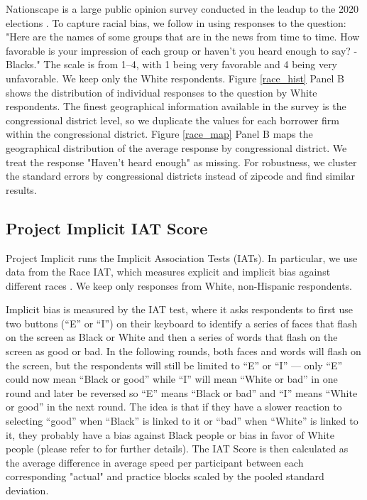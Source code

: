 \documentclass[11pt]{article}
\begin{document}
Nationscape is a large public opinion survey conducted in the leadup to the 2020 elections \citep{tausanovitch2020democracy}. To capture racial bias, we follow \cite{bursztyn2021immigrant} in using responses to the question: "Here are the names of some groups that are in the news from time to time. How favorable is your impression of each group or haven’t you heard enough to say? - Blacks." The scale is from 1--4, with 1 being very favorable and 4 being very unfavorable. We keep only the White respondents. Figure \ref{race_hist} Panel B shows the distribution of individual responses to the question by White respondents. The finest geographical information available in the survey is the congressional district level, so we duplicate the values for each borrower firm within the congressional district. Figure \ref{race_map} Panel B maps the geographical distribution of the average response by congressional district. We treat the response "Haven't heard enough" as missing. For robustness, we cluster the standard errors by congressional districts instead of zipcode and find similar results.

\subsection{Project Implicit IAT Score}

Project Implicit runs the Implicit Association Tests (IATs). In particular, we use data from the Race IAT, which measures explicit and implicit bias against different races \citep{xu2014psychology}. We keep only responses from White, non-Hispanic respondents.

Implicit bias is measured by the IAT test, where it asks respondents to first use two buttons (“E” or “I”) on their keyboard to identify a series of faces that flash on the screen as Black or White and then a series of words that flash on the screen as good or bad. In the following rounds, both faces and words will flash on the screen, but the respondents will still be limited to “E” or “I” — only “E” could now mean “Black or good” while “I” will mean “White or bad” in one round and later be reversed so “E” means “Black or bad” and “I” means “White or good” in the next round. The idea is that if they have a slower reaction to selecting “good” when “Black” is linked to it or “bad” when “White” is linked to it, they probably have a bias against Black people or bias in favor of White people (please refer to \cite{lopez2017for} for further details). The IAT Score is then calculated as the average difference in average speed per participant between each corresponding "actual" and practice blocks scaled by the pooled standard deviation. 
\end{document}
